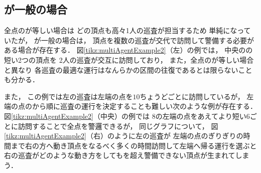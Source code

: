 
\subsection{{\idletime}が一般の場合}
\label{subsec:LineDifferentTimelimit}

全点の{\idletime}が等しい場合は
どの頂点も高々1人の巡査が担当するため
単純になっていたが，
{\idletime}が一般の場合は，
頂点を複数の巡査が交代で訪問して警備する必要がある場合が存在する．
%
図\ref{tikz:multiAgentExample2}（左）の例では，
中央の{\idletime}の短い2つの頂点を
2人の巡査が交互に訪問しており，
また，全点の{\idletime}が等しい場合と異なり
各巡査の最適な運行はなんらかの区間の往復であるとは限らないことも分かる．


また，
この例では左の巡査は左端の点を{\idletime}$10$ちょうどごとに訪問しているが，
左端の点の{\idletime}から順に巡査の運行を決定することも難しい次のような例が存在する．
図\ref{tikz:multiAgentExample2}（中央）の例では
{\idletime}$8$の左端の点をあえてより短い$6$ごとに訪問することで全点を警邏できるが，
同じグラフについて，
図\ref{tikz:multiAgentExample2}（右）のように左の巡査が
左端の点の{\idletime}ぎりぎりの時間まで右の方へ動き頂点をなるべく多くの時間訪問して左端へ帰る運行を選ぶと
右の巡査がどのような動き方をしても{\idletime}を超え警備できない頂点が生まれてしまう．



